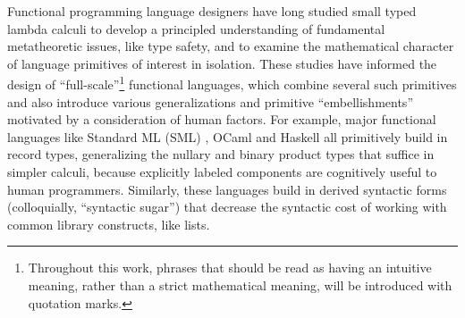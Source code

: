 Functional programming language designers have long studied small typed lambda calculi to develop a principled understanding of  fundamental metatheoretic issues, like type safety, and to examine the mathematical character of language primitives of interest in isolation. These studies have informed the design of ``full-scale''\footnote{Throughout this work, phrases that should be read as having an intuitive meaning, rather than a strict mathematical meaning, will be introduced with quotation marks.} functional languages, which combine several such primitives and also introduce various generalizations and primitive ``embellishments''  motivated by a consideration of human factors. 
For example, major functional languages like Standard ML (SML) \cite{mthm97-for-dart,harper1997programming}, OCaml \cite{ocaml-manual} and Haskell \cite{jones2003haskell} all primitively build in record types, generalizing the nullary and binary product types that suffice in simpler calculi, because explicitly labeled components are cognitively useful to human programmers. Similarly, these languages build in derived syntactic forms (colloquially, ``syntactic sugar'') that decrease the syntactic cost of  working with common library constructs, like lists.

